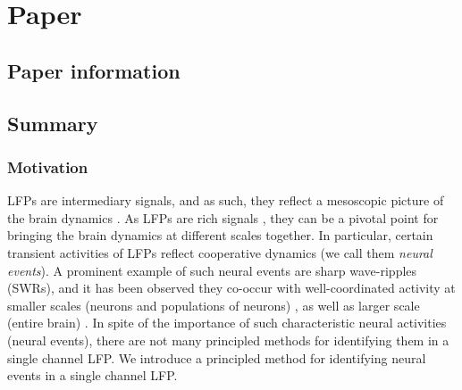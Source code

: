 \chapter{Paper }\label{cha:paper-besserve2020ned}
\section*{Paper information} %



\section*{Summary} %
\subsection*{Motivation}
LFPs are intermediary signals, and as such, they
reflect a mesoscopic picture of the brain dynamics \cite{liljenstroemMesoscopicBrainDynamics2012}.
As LFPs are rich signals \cite{buzsakiOriginExtracellularFields2012,liljenstroemMesoscopicBrainDynamics2012,einevollModellingAnalysisLocal2013},
they can be a pivotal point for bringing the brain dynamics at different scales together. 
In particular, certain transient activities of LFPs reflect cooperative dynamics (we call them \emph{neural events}).
A prominent example of such neural events are sharp wave-ripples (SWRs),
and it has been observed they co-occur with well-coordinated activity at smaller scales (neurons and populations of neurons) \cite{csicsvariEnsemblePatternsHippocampal2000,csicsvariEnsemblePatternsHippocampal2000,olivaRoleHippocampalCA22016},
as well as larger scale (entire brain) \cite{logothetisHippocampalCorticalInteraction2012,karimiabadchiSpatiotemporalPatternsNeocortical2020}.
In spite of the importance of such characteristic neural activities (neural events),
there are not many principled methods for identifying them in a single channel LFP.
We introduce a principled method for identifying neural events in a single channel LFP.


